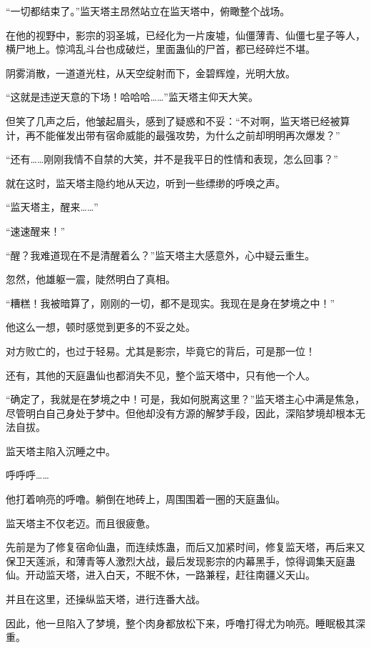 
\begin{this_body}

“一切都结束了。”监天塔主昂然站立在监天塔中，俯瞰整个战场。

在他的视野中，影宗的羽圣城，已经化为一片废墟，仙僵薄青、仙僵七星子等人，横尸地上。惊鸿乱斗台也成破烂，里面蛊仙的尸首，都已经碎烂不堪。

阴雾消散，一道道光柱，从天空绽射而下，金碧辉煌，光明大放。

“这就是违逆天意的下场！哈哈哈……”监天塔主仰天大笑。

但笑了几声之后，他皱起眉头，感到了疑惑和不妥：“不对啊，监天塔已经被算计，再不能催发出带有宿命威能的最强攻势，为什么之前却明明再次爆发？”

“还有……刚刚我情不自禁的大笑，并不是我平日的性情和表现，怎么回事？”

就在这时，监天塔主隐约地从天边，听到一些缥缈的呼唤之声。

“监天塔主，醒来……”

“速速醒来！”

“醒？我难道现在不是清醒着么？”监天塔主大感意外，心中疑云重生。

忽然，他雄躯一震，陡然明白了真相。

“糟糕！我被暗算了，刚刚的一切，都不是现实。我现在是身在梦境之中！”

他这么一想，顿时感觉到更多的不妥之处。

对方败亡的，也过于轻易。尤其是影宗，毕竟它的背后，可是那一位！

还有，其他的天庭蛊仙也都消失不见，整个监天塔中，只有他一个人。

“确定了，我就是在梦境之中！可是，我如何脱离这里？”监天塔主心中满是焦急，尽管明白自己身处于梦中。但他却没有方源的解梦手段，因此，深陷梦境却根本无法自拔。

监天塔主陷入沉睡之中。

呼呼呼……

他打着响亮的呼噜。躺倒在地砖上，周围围着一圈的天庭蛊仙。

监天塔主不仅老迈。而且很疲惫。

先前是为了修复宿命仙蛊，而连续炼蛊，而后又加紧时间，修复监天塔，再后来又保卫天莲派，和薄青等人激烈大战，最后发现影宗的内幕黑手，惊得调集天庭蛊仙。开动监天塔，进入白天，不眠不休，一路兼程，赶往南疆义天山。

并且在这里，还操纵监天塔，进行连番大战。

因此，他一旦陷入了梦境，整个肉身都放松下来，呼噜打得尤为响亮。睡眠极其深重。


\end{this_body}
